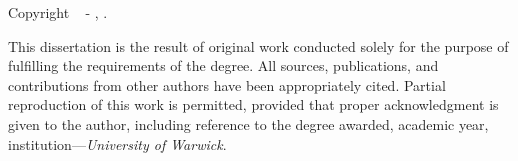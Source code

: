 
\begin{titlepage}

\vspace*{\fill}

{%
    \noindent \textbf{\GetTitle}
    
    \noindent Copyright \textcopyright~\the\year{} - \GetFirstAuthor, \GetSchool.
    
    \vspace{.575em}

    \noindent This dissertation is the result of original work conducted solely for the purpose of fulfilling the requirements of the degree. All sources, publications, and contributions from other authors have been appropriately cited. Partial reproduction of this work is permitted, provided that proper acknowledgment is given to the author, including reference to the degree awarded, academic year, institution---\textit{University of Warwick}.

    \vspace{2.4em}
    
    \noindent{}
    

}

\vspace*{\fill}

\end{titlepage}
